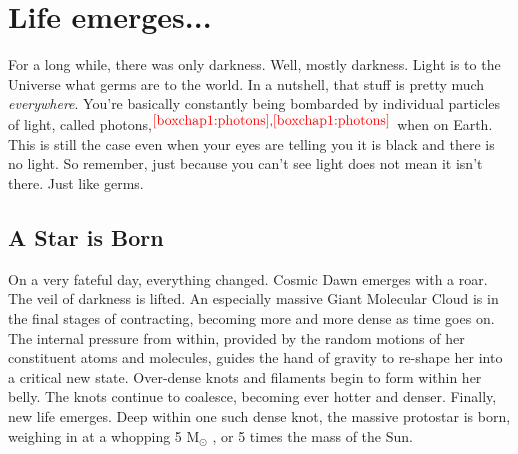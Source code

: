 \documentclass[main.tex]{subfiles}
\begin{document}
\chapter{Life emerges...}

\par \nar For a long while, there was only darkness.  Well, mostly darkness.  Light is to the Universe what germs are to the world.  In a nutshell, that stuff is pretty much \textit{everywhere}.  You're basically constantly being bombarded by individual particles of light, called photons,$^{\textcolor{red}{\ref{boxchap1:photons}},\textcolor{red}{\ref{boxchap1:photons}}}$ when on Earth.  This is still the case even when your eyes are telling you it is black and there is no light.  So remember, just because you can't see light does not mean it isn't there.  Just like germs.


\section{A Star is Born} \label{born}

\par \nar On a very fateful day, everything changed.  Cosmic Dawn emerges with a roar.  The veil of darkness is lifted.  An especially massive Giant Molecular Cloud is in the final stages of contracting, becoming more and more dense as time goes on.  The internal pressure from within, provided by the random motions of her constituent atoms and molecules, guides the hand of gravity to re-shape her into a critical new state.  Over-dense knots and filaments begin to form within her belly.  The knots continue to coalesce, becoming ever hotter and denser.  Finally, new life emerges.  Deep within one such dense knot, the massive protostar \rmmaia is born, weighing in at a whopping 5 M$_{\odot}$ , or 5 times the mass of the Sun.
\end{document}
